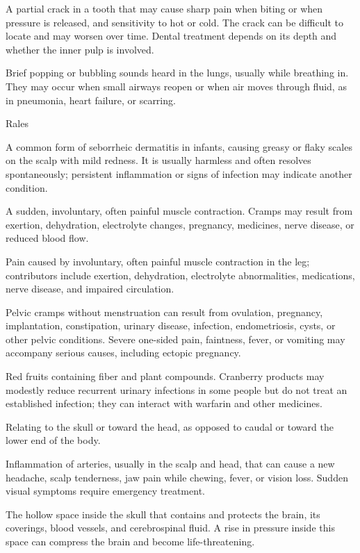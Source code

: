  A partial crack in a tooth that may cause sharp pain when biting or when pressure is released, and sensitivity to hot or cold. The crack can be difficult to locate and may worsen over time. Dental treatment depends on its depth and whether the inner pulp is involved.

 Brief popping or bubbling sounds heard in the lungs, usually while breathing in. They may occur when small airways reopen or when air moves through fluid, as in pneumonia, heart failure, or scarring.

\synonyms
Rales

 A common form of seborrheic dermatitis in infants, causing greasy or flaky scales on the
scalp with mild redness. It is usually harmless and often resolves spontaneously; persistent inflammation or signs of infection may indicate another condition.

 A sudden, involuntary, often painful muscle contraction. Cramps may result from exertion, dehydration, electrolyte changes, pregnancy, medicines, nerve disease, or reduced blood flow.

 Pain caused by involuntary, often painful muscle contraction in the leg; contributors include exertion, dehydration, electrolyte abnormalities, medications, nerve disease, and impaired circulation.

 Pelvic cramps without menstruation can result from ovulation, pregnancy, implantation, constipation, urinary disease, infection, endometriosis, cysts, or other pelvic conditions. Severe one-sided pain, faintness, fever, or vomiting may accompany serious causes, including ectopic pregnancy.

 Red fruits containing fiber and plant compounds. Cranberry products may modestly reduce recurrent urinary infections in some people but do not treat an established infection; they can interact with warfarin and other medicines.

 Relating to the skull or toward the head, as opposed to caudal or toward the lower end of the body.

 Inflammation of arteries, usually in the scalp and head, that can cause a new headache, scalp tenderness, jaw pain while chewing, fever, or vision loss. Sudden visual symptoms require emergency treatment.

 The hollow space inside the skull that contains and protects the brain, its coverings, blood vessels, and cerebrospinal fluid. A rise in pressure inside this space can compress the brain and become life-threatening.

